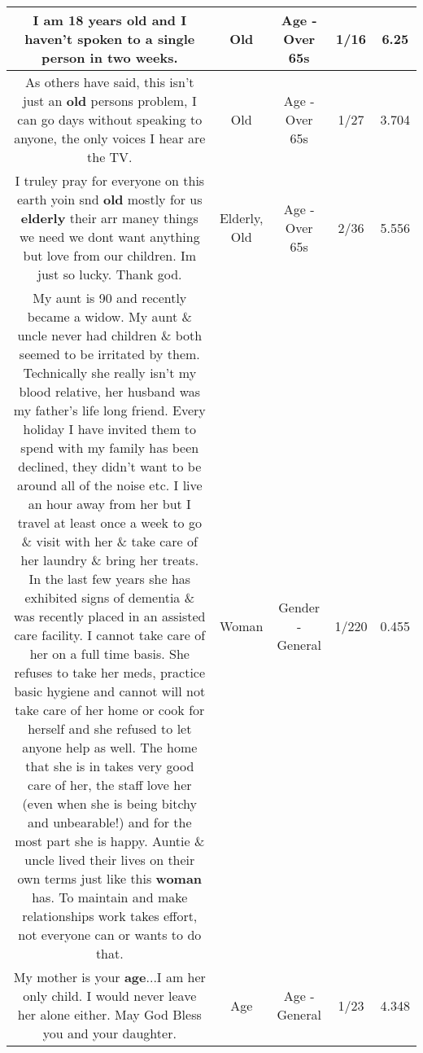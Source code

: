 \documentclass[11pt]{article}
\newlength\mylength
\begin{document}
\begin{center}
\begin{longtable}{|C{.65\mylength}|C{.30\mylength}|C{.12\mylength}|C{.12\mylength}|C{.12\mylength}|}
  \small I am 18 years \textbf{old} and I haven't spoken to a single person in two weeks.\normalsize   & Old & Age - Over 65s & 1/16 & 6.25 \\  \hline
  \small As others have said, this isn't just an \textbf{old} persons problem, I can go days without speaking to anyone, the only voices I hear are the TV.\normalsize   & Old & Age - Over 65s & 1/27 & 3.704 \\  \hline
  \small I truley pray for everyone on this earth yoin snd \textbf{old} mostly for us \textbf{elderly} their arr maney things we need we dont want anything but love from our children. Im just so lucky. Thank god.\normalsize   & Elderly, Old & Age - Over 65s & 2/36 & 5.556 \\  \hline
  \small My aunt is 90 and recently became a widow. My aunt \& uncle never had children \& both seemed to be irritated by them. Technically she really isn't my blood relative, her husband was my father's life long friend. Every holiday I have invited them to spend with my family has been declined, they didn't want to be around all of the noise etc. I live an hour away from her but I travel at least once a week to go \& visit with her \& take care of her laundry \& bring her treats. In the last few years she has exhibited signs of dementia \& was recently placed in an assisted care facility. I cannot take care of her on a full time basis. She refuses to take her meds, practice basic hygiene and cannot will not take care of her home or cook for herself and she refused to let anyone help as well. The home that she is in takes very good care of her, the staff love her (even when she is being bitchy and unbearable!) and for the most part she is happy. Auntie \& uncle lived their lives on their own terms just like this \textbf{woman} has. To maintain and make relationships work takes effort, not everyone can or wants to do that.\normalsize   & Woman & Gender - General & 1/220 & 0.455 \\  \hline
  \small My mother is your \textbf{age}...I am her only child. I would never leave her alone either. May God Bless you and your daughter.\normalsize   & Age & Age - General & 1/23 & 4.348 \\  \hline

\end{longtable}
\end{center}
\end{document}

